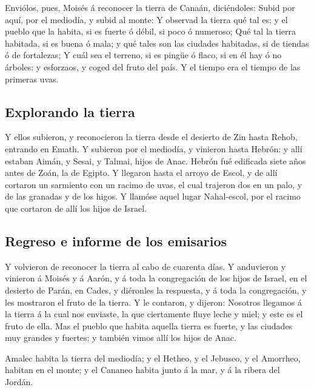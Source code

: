  Enviólos, pues, Moisés á reconocer la tierra de Canaán,
diciéndoles: Subid por aquí, por el mediodía, y subid al monte:
 Y observad la tierra qué tal es; y el pueblo que la
habita, si es fuerte ó débil, si poco ó numeroso;  Qué
tal la tierra habitada, si es buena ó mala; y qué tales son las ciudades
habitadas, si de tiendas ó de fortalezas;  Y cuál sea el
terreno, si es pingüe ó flaco, si en él hay ó no árboles: y esforzaos, y
coged del fruto del país. Y el tiempo era el tiempo de las primeras
uvas.

\hypertarget{explorando-la-tierra}{%
\subsection{Explorando la tierra}\label{explorando-la-tierra}}

 Y ellos subieron, y reconocieron la tierra desde el
desierto de Zin hasta Rehob, entrando en Emath.  Y
subieron por el mediodía, y vinieron hasta Hebrón: y allí estaban Aimán,
y Sesai, y Talmai, hijos de Anac. Hebrón fué edificada siete años antes
de Zoán, la de Egipto.  Y llegaron hasta el arroyo de
Escol, y de allí cortaron un sarmiento con un racimo de uvas, el cual
trajeron dos en un palo, y de las granadas y de los higos.
 Y llamóse aquel lugar Nahal-escol, por el racimo que
cortaron de allí los hijos de Israel.

\hypertarget{regreso-e-informe-de-los-emisarios}{%
\subsection{Regreso e informe de los
emisarios}\label{regreso-e-informe-de-los-emisarios}}

 Y volvieron de reconocer la tierra al cabo de cuarenta
días.  Y anduvieron y vinieron á Moisés y á Aarón, y á
toda la congregación de los hijos de Israel, en el desierto de Parán, en
Cades, y diéronles la respuesta, y á toda la congregación, y les
mostraron el fruto de la tierra.  Y le contaron, y
dijeron: Nosotros llegamos á la tierra á la cual nos enviaste, la que
ciertamente fluye leche y miel; y este es el fruto de ella.
 Mas el pueblo que habita aquella tierra es fuerte, y las
ciudades muy grandes y fuertes; y también vimos allí los hijos de Anac.

 Amalec habita la tierra del mediodía; y el Hetheo, y el
Jebuseo, y el Amorrheo, habitan en el monte; y el Cananeo habita junto á
la mar, y á la ribera del Jordán.

